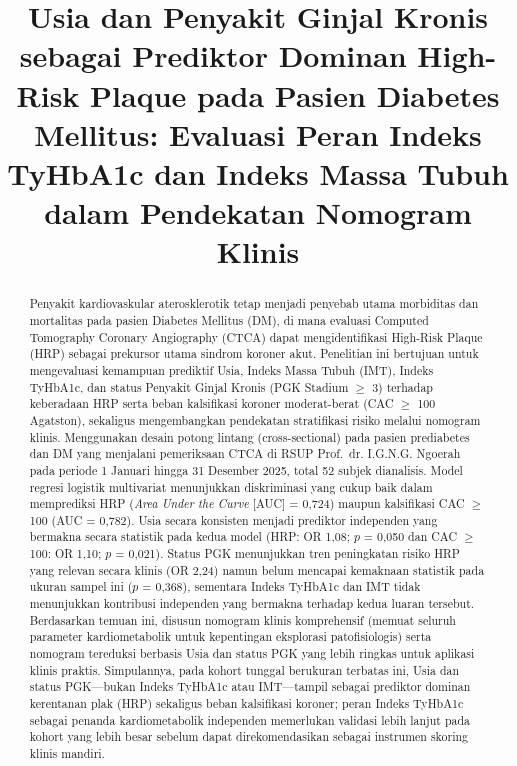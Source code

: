\documentclass[
  indonesian,
]{agujournal2019}
\begin{document}
\title{Usia dan Penyakit Ginjal Kronis sebagai Prediktor Dominan
High-Risk Plaque pada Pasien Diabetes Mellitus: Evaluasi Peran Indeks
TyHbA1c dan Indeks Massa Tubuh dalam Pendekatan Nomogram Klinis}



\begin{abstract}
Penyakit kardiovaskular aterosklerotik tetap menjadi penyebab utama
morbiditas dan mortalitas pada pasien Diabetes Mellitus (DM), di mana
evaluasi Computed Tomography Coronary Angiography (CTCA) dapat
mengidentifikasi High-Risk Plaque (HRP) sebagai prekursor utama sindrom
koroner akut. Penelitian ini bertujuan untuk mengevaluasi kemampuan
prediktif Usia, Indeks Massa Tubuh (IMT), Indeks TyHbA1c, dan status
Penyakit Ginjal Kronis (PGK Stadium \(\ge\) 3) terhadap keberadaan HRP
serta beban kalsifikasi koroner moderat-berat (CAC \(\ge\) 100
Agatston), sekaligus mengembangkan pendekatan stratifikasi risiko
melalui nomogram klinis. Menggunakan desain potong lintang
(cross-sectional) pada pasien prediabetes dan DM yang menjalani
pemeriksaan CTCA di RSUP Prof.~dr. I.G.N.G. Ngoerah pada periode 1
Januari hingga 31 Desember 2025, total 52 subjek dianalisis. Model
regresi logistik multivariat menunjukkan diskriminasi yang cukup baik
dalam memprediksi HRP (\emph{Area Under the Curve} {[}AUC{]} = 0,724)
maupun kalsifikasi CAC \(\ge\) 100 (AUC = 0,782). Usia secara konsisten
menjadi prediktor independen yang bermakna secara statistik pada kedua
model (HRP: OR 1,08; \(p\) = 0,050 dan CAC \(\ge\) 100: OR 1,10; \(p\) =
0,021). Status PGK menunjukkan tren peningkatan risiko HRP yang relevan
secara klinis (OR 2,24) namun belum mencapai kemaknaan statistik pada
ukuran sampel ini (\(p\) = 0,368), sementara Indeks TyHbA1c dan IMT
tidak menunjukkan kontribusi independen yang bermakna terhadap kedua
luaran tersebut. Berdasarkan temuan ini, disusun nomogram klinis
komprehensif (memuat seluruh parameter kardiometabolik untuk kepentingan
eksplorasi patofisiologis) serta nomogram tereduksi berbasis Usia dan
status PGK yang lebih ringkas untuk aplikasi klinis praktis.
Simpulannya, pada kohort tunggal berukuran terbatas ini, Usia dan status
PGK---bukan Indeks TyHbA1c atau IMT---tampil sebagai prediktor dominan
kerentanan plak (HRP) sekaligus beban kalsifikasi koroner; peran Indeks
TyHbA1c sebagai penanda kardiometabolik independen memerlukan validasi
lebih lanjut pada kohort yang lebih besar sebelum dapat direkomendasikan
sebagai instrumen skoring klinis mandiri.


\end{abstract}
\end{document}
